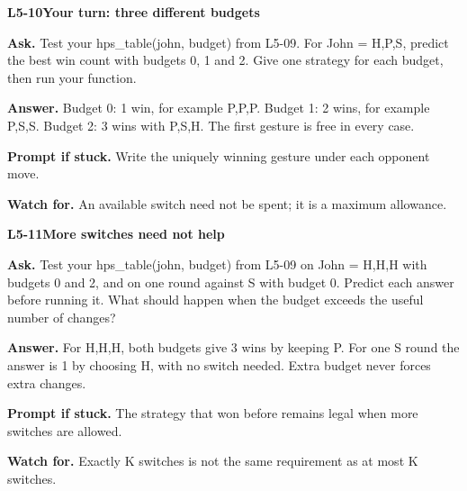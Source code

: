 \documentclass[11pt,a4paper]{article}
\begin{document}
\par\medskip
\noindent\begin{minipage}{\textwidth}
{\color{teal}\textbf{L5-10}}\quad \textbf{Your turn: three different budgets}\par\smallskip
\textbf{Ask.} Test your hps\_table(john, budget) from L5-09. For John = H,P,S, predict the best win count with budgets 0, 1 and 2. Give one strategy for each budget, then run your function.\par\smallskip
\textbf{Answer.} Budget 0: 1 win, for example P,P,P. Budget 1: 2 wins, for example P,S,S. Budget 2: 3 wins with P,S,H. The first gesture is free in every case.\par\smallskip
\textbf{Prompt if stuck.} Write the uniquely winning gesture under each opponent move.\par\smallskip
\textbf{Watch for.} An available switch need not be spent; it is a maximum allowance.
\end{minipage}\par{}\medskip

\noindent\begin{minipage}{\textwidth}
{\color{teal}\textbf{L5-11}}\quad \textbf{More switches need not help}\par\smallskip
\textbf{Ask.} Test your hps\_table(john, budget) from L5-09 on John = H,H,H with budgets 0 and 2, and on one round against S with budget 0. Predict each answer before running it. What should happen when the budget exceeds the useful number of changes?\par\smallskip
\textbf{Answer.} For H,H,H, both budgets give 3 wins by keeping P. For one S round the answer is 1 by choosing H, with no switch needed. Extra budget never forces extra changes.\par\smallskip
\textbf{Prompt if stuck.} The strategy that won before remains legal when more switches are allowed.\par\smallskip
\textbf{Watch for.} Exactly K switches is not the same requirement as at most K switches.
\end{minipage}\par{}\medskip
\end{document}
